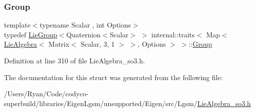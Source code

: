 \hypertarget{structinternal_1_1traits_3_01_map_3_01_lie_algebra_3_01_matrix_3_01_scalar_00_013_00_011_01_4_01_4_00_01_options_01_4_01_4_a3ade09718f291d48f6471acab1dc0a38}{}\label{structinternal_1_1traits_3_01_map_3_01_lie_algebra_3_01_matrix_3_01_scalar_00_013_00_011_01_4_01_4_00_01_options_01_4_01_4_a3ade09718f291d48f6471acab1dc0a38} 
\subsubsection{\texorpdfstring{Group}{Group}}
{\footnotesize\ttfamily template$<$typename Scalar , int Options$>$ \\
typedef \hyperlink{class_lie_group}{Lie\+Group}$<$Quaternion$<$Scalar$>$ $>$ internal\+::traits$<$ Map$<$ \hyperlink{class_lie_algebra}{Lie\+Algebra}$<$ Matrix$<$ Scalar, 3, 1 $>$ $>$, Options $>$ $>$\+::\hyperlink{structinternal_1_1traits_3_01_map_3_01_lie_algebra_3_01_matrix_3_01_scalar_00_013_00_011_01_4_01_4_00_01_options_01_4_01_4_a3ade09718f291d48f6471acab1dc0a38}{Group}}



Definition at line 310 of file Lie\+Algebra\+\_\+so3.\+h.



The documentation for this struct was generated from the following file\+:\begin{DoxyCompactItemize}
\item 
/\+Users/\+Ryan/\+Code/codyco-\/superbuild/libraries/\+Eigen\+Lgsm/unsupported/\+Eigen/src/\+Lgsm/\hyperlink{_lie_algebra__so3_8h}{Lie\+Algebra\+\_\+so3.\+h}\end{DoxyCompactItemize}
